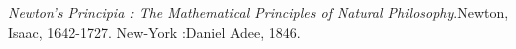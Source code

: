 \documentclass[prl,twocolumn]{revtex4-1}  %
\begin{document}
\begin{thebibliography}{99}

 \textit{Newton's Principia : The Mathematical Principles of Natural Philosophy}.Newton, Isaac, 1642-1727.  New-York :Daniel Adee, 1846.


\end{thebibliography}
\end{document}
